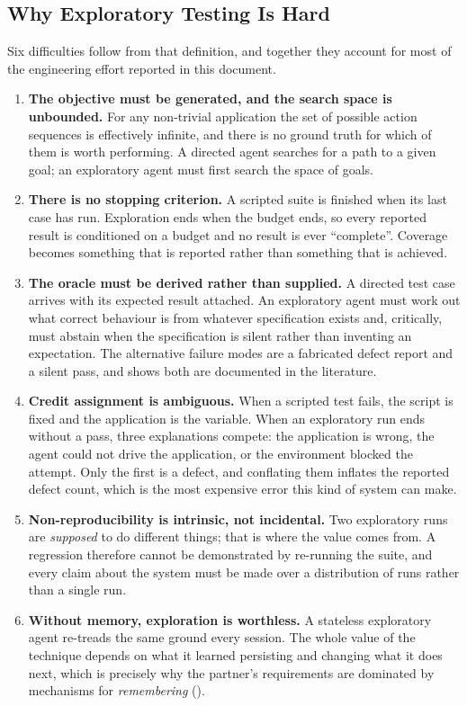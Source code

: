\subsection{Why Exploratory Testing Is Hard}
\label{subsec:whyhard}

Six difficulties follow from that definition, and together they account for
most of the engineering effort reported in this document.

\begin{enumerate}[label=\textbf{D\arabic*.},leftmargin=3.0em]
  \item \textbf{The objective must be generated, and the search space is
    unbounded.} For any non-trivial application the set of possible action
    sequences is effectively infinite, and there is no ground truth for which
    of them is worth performing. A directed agent searches for a path to a
    given goal; an exploratory agent must first search the space of goals.
  \item \textbf{There is no stopping criterion.} A scripted suite is finished
    when its last case has run. Exploration ends when the budget ends, so every
    reported result is conditioned on a budget and no result is ever
    ``complete''. Coverage becomes something that is reported rather than
    something that is achieved.
  \item \textbf{The oracle must be derived rather than supplied.} A directed
    test case arrives with its expected result attached. An exploratory agent
    must work out what correct behaviour is from whatever specification exists and, critically, must abstain when the specification is silent rather than
    inventing an expectation. The alternative failure modes are a fabricated
    defect report and a silent pass, and  shows both are
    documented in the literature.
  \item \textbf{Credit assignment is ambiguous.} When a scripted test fails, the
    script is fixed and the application is the variable. When an exploratory run
    ends without a pass, three explanations compete: the application is wrong,
    the agent could not drive the application, or the environment blocked the
    attempt. Only the first is a defect, and conflating them inflates the reported defect count, which is the most expensive error this kind of system can make.
  \item \textbf{Non-reproducibility is intrinsic, not incidental.} Two
    exploratory runs are \emph{supposed} to do different things; that is where
    the value comes from. A regression therefore cannot be demonstrated by
    re-running the suite, and every claim about the system must be made over a
    distribution of runs rather than a single run.
  \item \textbf{Without memory, exploration is worthless.} A stateless
    exploratory agent re-treads the same ground every session. The whole value
    of the technique depends on what it learned persisting and changing what it does next, which is precisely why the partner's requirements are dominated
    by mechanisms for \emph{remembering} ().
\end{enumerate}

